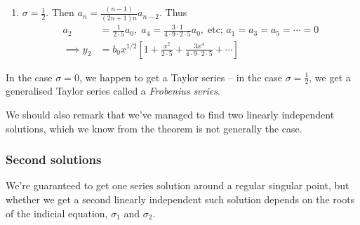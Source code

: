 \documentclass{../../template/note}
\begin{document}
\begin{example}
\begin{enumerate}[label=\protect\circled{\arabic*}]
\begin{align*}
                \implies y_1 &= a_0\left[1+\frac{x^2}{4 \cdot 3} + \frac{5x^4}{8\cdot 7 \cdot 4 \cdot 3} + \cdots\right]
            \end{align*}
            \item \(\sigma = \frac{1}{2}\). Then \(a_n = \frac{(n-1)}{(2n+1)n}a_{n-2}\). Thus
            \begin{align*}
                a_2 &= \frac{1}{2 \cdot 5}a_0,\; a_4 = \frac{3 \cdot 1}{4 \cdot 9 \cdot 2 \cdot 5}a_0, \; \text{etc; } a_1 = a_3 = a_5 = \cdots = 0 \\
                \implies y_2 &= b_0x^{1/2}\left[1+\frac{x^2}{2\cdot 5} + \frac{3x^4}{4 \cdot 9 \cdot 2 \cdot 5} + \cdots\right]
            \end{align*}
        \end{enumerate}
        In the case \(\sigma = 0\), we happen to get a Taylor series -- in the case \(\sigma = \frac{1}{2}\), we get a generalised Taylor series called a \emph{Frobenius series}.

        We should also remark that we've managed to find two linearly independent solutions, which we know from the theorem is not generally the case.        
    \end{example}
    
    \subsubsection{Second solutions}

    We're guaranteed to get one series solution around a regular singular point, but whether we get a second linearly independent such solution depends on the roots of the indicial equation, \(\sigma_1\) and \(\sigma_2\).
\end{document}
